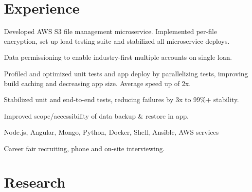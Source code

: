 \documentclass[]{yubo-resume-openfont}
\begin{document}
\begin{minipage}[t]{0.33\textwidth}
%
%

\end{minipage}
\hfill
\begin{minipage}[t]{0.66\textwidth}


\section{Experience}

\vspace{\topsep} %
\begin{tightemize}
    \item Developed AWS S3 file management microservice. Implemented per-file
        encryption, set up load testing suite and stabilized all microservice
        deploys.
    \item Data permissioning to enable industry-first multiple accounts on
        single loan.
    \item Profiled and optimized unit tests and app deploy by parallelizing
        tests, improving build caching and decreasing app size. Average speed
        up of 2x.
    \item Stabilized unit and end-to-end tests, reducing failures by 3x to 99\%+
        stability.
    \item Improved scope/accessibility of data backup \& restore in app.
    \item Node.js, Angular, Mongo, Python, Docker, Shell, Ansible, AWS services
    \item Career fair recruiting, phone and on-site interviewing.
\end{tightemize}
\sectionsep


\section{Research}

\end{minipage}
\end{document}
